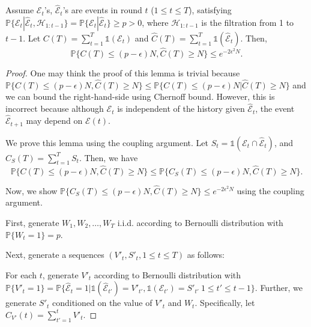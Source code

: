 \begin{lemma} \label{thm:context_action_pair_errorprob_wContext}
Assume $\mathcal{E}_t$'s, $\hat{\mathcal{E}}_t$'s are events in round $t$ ($1\leq t \leq T$), satisfying $\mathbb{P}\{\mathcal{E}_t| \hat{\mathcal{E}}_t, \mathcal{H}_{1:t-1}\} = \mathbb{P}\{\mathcal{E}_t| \hat{\mathcal{E}}_t\} \geq p> 0$, where $\mathcal{H}_{1:t-1}$ is the filtration from 1 to $t-1$. Let $C(T) = \sum_{t=1}^T \mathds{1}(\mathcal{E}_t)$ and $\widehat{C}(T) = \sum_{t=1}^T \mathds{1}(\hat{\mathcal{E}}_t)$. Then,
\begin{equation}
\mathbb{P}\{C(T) \leq (p-\epsilon) N, \widehat{C}(T) \geq N \} \leq e^{-2 \epsilon^2 N}. \nonumber
\end{equation}
\end{lemma}
\begin{proof}
One may think the proof of this lemma is trivial because  $\mathbb{P}\{C(T) \leq (p-\epsilon) N, \widehat{C}(T) \geq N \} \leq \mathbb{P}\{C(T) \leq (p-\epsilon) N |\widehat{C}(T) \geq N \}$ and we can bound the right-hand-side using Chernoff bound. However, this is incorrect because although $\mathcal{E}_t$ is independent of the history given $\hat{\mathcal{E}}_t$, the event $\hat{\mathcal{E}}_{t+1}$ may depend on $\mathcal{E}(t)$.

We prove this lemma using the coupling argument.
Let $S_t = \mathds{1}(\mathcal{E}_t \cap \hat{\mathcal{E}}_t)$, and $C_S(T) = \sum_{t=1}^T S_t$. Then, we have
\begin{equation}
\mathbb{P}\{C(T) \leq (p-\epsilon) N, \widehat{C}(T) \geq N \} \leq \mathbb{P}\{C_S(T) \leq (p-\epsilon) N, \widehat{C}(T) \geq N \}.
\end{equation}

Now, we show $\mathbb{P}\{C_S(T) \leq (p-\epsilon) N, \widehat{C}(T) \geq N \} \leq e^{-2 \epsilon^2 N}$  using the coupling argument.

First, generate  $W_1, W_2, \ldots, W_T$  i.i.d. according to Bernoulli distribution with $\mathbb{P}\{W_t = 1\} = p$.

Next, generate a sequences  $(V'_t, S'_t, 1\leq t \leq T)$ as follows:

For each $t$, generate $V'_t$ according to Bernoulli distribution with $\mathbb{P}\{V'_t = 1\} = \mathbb{P}\{\hat{\mathcal{E}}_t = 1|\mathds{1}(\hat{\mathcal{E}}_{t'})= V'_{t'},\mathds{1}({\mathcal{E}}_{t'})= S'_{t'} ~1\leq t' \leq t-1\}$. Further, we  generate $S'_t$ conditioned on the value of $V'_t$ and $W_t$. Specifically, let $C_{V'}(t) = \sum_{t'= 1}^t V'_t$.


\end{proof}
